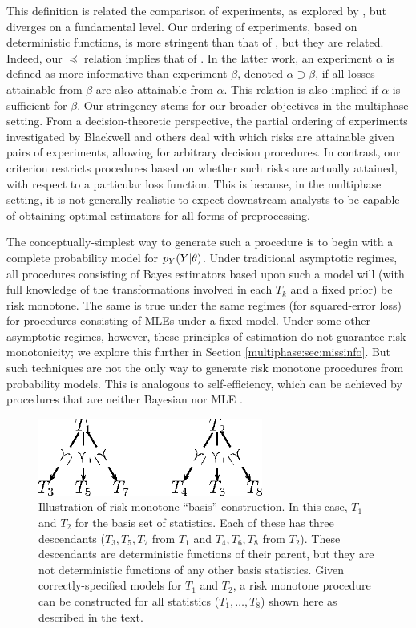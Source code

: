 This definition is related the comparison of experiments, as explored by \citet{Blackwell51,Blackwell53}, but diverges on a fundamental level.
Our ordering of experiments, based on deterministic functions, is more stringent than that of \cite{Blackwell53}, but they are related.
Indeed, our $\preceq$ relation implies that of \citet{Blackwell53}.
In the latter work, an experiment $\alpha$ is defined as more informative than experiment $\beta$, denoted $\alpha \supset \beta$, if all losses attainable from $\beta$ are also attainable from $\alpha$.
This relation is also implied if $\alpha$ is sufficient for $\beta$.
Our stringency stems for our broader objectives in the multiphase setting.
From a decision-theoretic perspective, the partial ordering of experiments investigated by Blackwell and others deal with which risks are attainable given pairs of experiments, allowing for arbitrary decision procedures.
In contrast, our criterion restricts procedures based on whether such risks are actually attained, with respect to a particular loss function.
This is because, in the multiphase setting, it is not generally realistic to expect downstream analysts to be capable of obtaining optimal estimators for all forms of preprocessing.

The conceptually-simplest way to generate such a procedure is to begin with a complete probability model for $p_Y(Y | \theta)$.
Under traditional asymptotic regimes, all procedures consisting of Bayes estimators based upon such a model will (with full knowledge of the transformations involved in each $T_k$ and a fixed prior) be risk monotone.
The same is true under the same regimes (for squared-error loss) for procedures consisting of MLEs under a fixed model.
Under some other asymptotic regimes, however, these principles of estimation do not guarantee risk-monotonicity; we explore this further in Section \ref{multiphase:sec:missinfo}.
But such techniques are not the only way to generate risk monotone procedures from probability models.
This is analogous to self-efficiency, which can be achieved by procedures that are neither Bayesian nor MLE \citep{Meng1994,Xie2012}.

\begin{figure}
\includegraphics[height=1in]{figures/multiphase/diagram_risk-monotone.eps}
\caption{Illustration of risk-monotone ``basis'' construction. In this case, $T_1$ and $T_2$ for the basis set of statistics. Each of these has three descendants ($T_3, T_5, T_7$ from $T_1$ and $T_4, T_6, T_8$ from $T_2$). These descendants are deterministic functions of their parent, but they are not deterministic functions of any other basis statistics. Given correctly-specified models for $T_1$ and $T_2$, a risk monotone procedure can be constructed for all statistics ($T_1, \ldots, T_8$) shown here as described in the text.
\label{multiphase:fig:risk-monotone}}
\end{figure}

